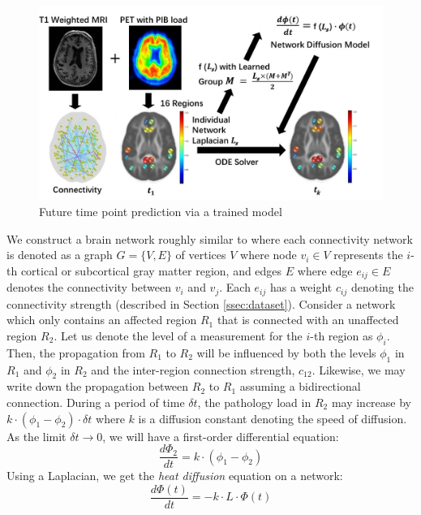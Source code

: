 \documentclass{article}
\begin{document}
\begin{figure}[!b]
\centering
\includegraphics[width=0.935\columnwidth]{we_need_this_TransposeM.jpg}
    \caption{Future time point prediction via a trained model}%
\end{figure}
We construct a brain network roughly similar
to \cite{raj_kuceyeski_weiner_2012} where each connectivity network is denoted as
a graph $G = \{ V,E \}$ of vertices $V$ where node $v_i \in V$ represents the $i$-th
cortical or subcortical gray matter region, and edges $E$ where edge $e_{ij} \in E$ denotes the connectivity 
between $v_i$ and $v_j$. 
Each $e_{ij}$ has a weight $c_{ij}$ denoting the connectivity strength (described in Section \ref{ssec:dataset}). Consider a network which only contains an affected region $R_1$ that is connected with an unaffected region $R_2$. 
Let us denote the level of a measurement 
for the $i$-th region as $\phi_i$. 
Then, the propagation from $R_1$ to $R_2$ will be influenced by 
both the levels $\phi_1$ in $R_1$ and $\phi_2$ in $R_2$ and the inter-region connection strength, $c_{12}$. 
Likewise, we may 
write down the propagation between $R_2$ to $R_1$ assuming a bidirectional connection.
During a period of time $\delta t$, the pathology load in $R_2$ may
increase by $k \cdot (\phi_1 - \phi_2)\cdot \delta t$ where $k$ is a diffusion constant denoting the speed of diffusion. 
As the limit $\delta t \rightarrow 0$, we will have a first-order differential equation:
\begin{equation}
\label{eqn:eq1} 
\frac{d\Phi_{2}}{dt} =k \cdot (\phi_1 - \phi_2)
\end{equation}
Using a Laplacian, we get the \textit{heat diffusion} equation on a network:
\begin{equation}
\label{eqn:eq2}
\frac{d\Phi(t)}{dt} = -k \cdot L \cdot \Phi(t)
\end{equation}
\end{document}
